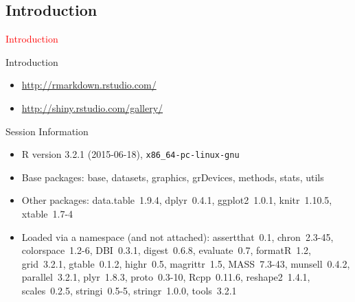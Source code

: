 \documentclass[11pt]{beamer}\usepackage[]{graphicx}\usepackage[]{color}
\begin{document}
\subsection{Introduction}

\begin{frame}
 \begin{center}
  \Huge{\textcolor{red}{Introduction}}
 \end{center}
\end{frame}


\begin{frame}{Introduction}
\begin{itemize}
\item \href{http://rmarkdown.rstudio.com/}{http://rmarkdown.rstudio.com/}
\item \href{http://shiny.rstudio.com/gallery/}{http://shiny.rstudio.com/gallery/}
\end{itemize}
\end{frame}





\begin{frame}[fragile]{Session Information}
\begin{itemize}\raggedright
  \item R version 3.2.1 (2015-06-18), \verb|x86_64-pc-linux-gnu|
  \item Base packages: base, datasets, graphics, grDevices, methods,
    stats, utils
  \item Other packages: data.table~1.9.4, dplyr~0.4.1, ggplot2~1.0.1,
    knitr~1.10.5, xtable~1.7-4
  \item Loaded via a namespace (and not attached): assertthat~0.1,
    chron~2.3-45, colorspace~1.2-6, DBI~0.3.1, digest~0.6.8,
    evaluate~0.7, formatR~1.2, grid~3.2.1, gtable~0.1.2, highr~0.5,
    magrittr~1.5, MASS~7.3-43, munsell~0.4.2, parallel~3.2.1,
    plyr~1.8.3, proto~0.3-10, Rcpp~0.11.6, reshape2~1.4.1,
    scales~0.2.5, stringi~0.5-5, stringr~1.0.0, tools~3.2.1
\end{itemize}


\end{frame}
\end{document}
